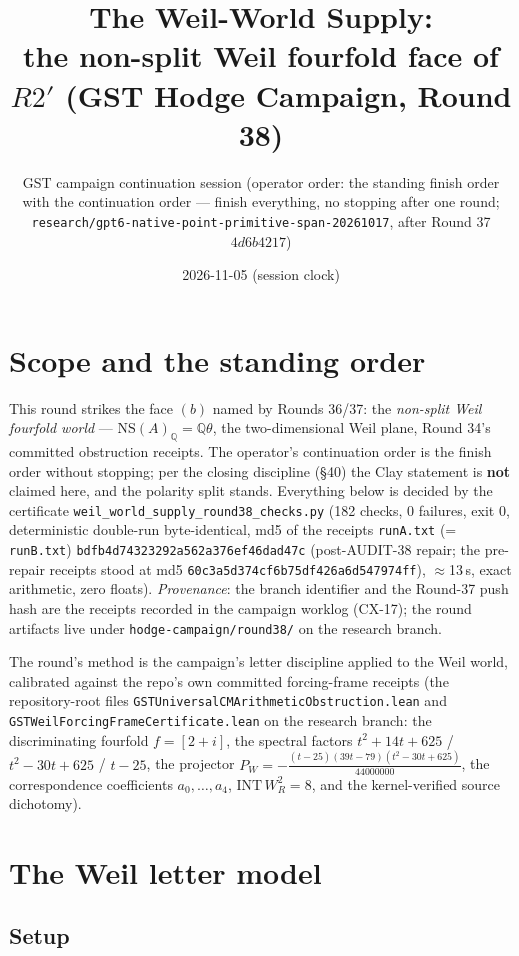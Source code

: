 \documentclass[11pt]{article}
\title{The Weil-World Supply:\\ the non-split Weil fourfold face of $R2'$ (GST Hodge Campaign, Round 38)}
\author{GST campaign continuation session (operator order: the standing finish order\\
with the continuation order --- finish everything, no stopping after one round;\\
\texttt{research/gpt6-native-point-primitive-span-20261017}, after Round 37 $4d6b4217$)}
\date{2026-11-05 (session clock)}
\begin{document}
\maketitle

\section*{Scope and the standing order}

This round strikes the face $(b)$ named by Rounds 36/37: the \emph{non-split
Weil fourfold world} --- $\mathrm{NS}(A)_\mathbb{Q} = \mathbb{Q}\theta$, the
two-dimensional Weil plane, Round 34's committed obstruction receipts. The
operator's continuation order is the finish order without stopping; per the
closing discipline (\S40) the Clay statement is \textbf{not} claimed here, and
the polarity split stands. Everything below is decided by the certificate
\texttt{weil\_world\_supply\_round38\_checks.py} (182 checks, 0 failures,
exit 0, deterministic double-run byte-identical, md5 of the receipts
\texttt{runA.txt} (= \texttt{runB.txt})
\texttt{bdfb4d74323292a562a376ef46dad47c} (post-AUDIT-38 repair; the
pre-repair receipts stood at md5
\texttt{60c3a5d374cf6b75df426a6d547974ff}), $\approx$13\,s, exact
arithmetic, zero floats). \emph{Provenance}: the branch identifier and the Round-37 push
hash are the receipts recorded in the campaign worklog (CX-17); the round
artifacts live under \texttt{hodge-campaign/round38/} on the research
branch.

The round's method is the campaign's letter discipline applied to the Weil
world, calibrated against the repo's own committed forcing-frame receipts
(the repository-root files
\texttt{GSTUniversalCMArithmeticObstruction.lean} and
\texttt{GSTWeilForcingFrameCertificate.lean} on the research branch: the
discriminating fourfold
$f = [2+i]$, the spectral factors $t^2{+}14t{+}625$ / $t^2{-}30t{+}625$ /
$t{-}25$, the projector
$P_W = -\frac{(t-25)(39t-79)(t^2-30t+625)}{44000000}$, the correspondence
coefficients $a_0,\dots,a_4$, $\mathrm{INT}\,W_R^2 = 8$, and the
kernel-verified source dichotomy).

\section{The Weil letter model}

\subsection{Setup}
\end{document}

